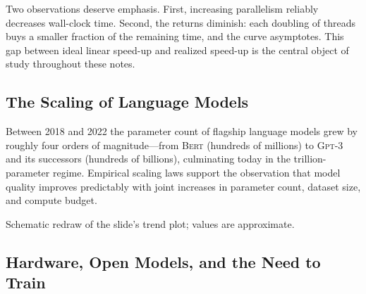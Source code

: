 \documentclass[11pt,a4paper]{article}
\theoremstyle{definition}
\theoremstyle{remark}
\theoremstyle{plain}
\begin{document}
Two observations deserve emphasis. First, increasing parallelism reliably
decreases wall-clock time. Second, the returns diminish: each doubling of
threads buys a smaller fraction of the remaining time, and the curve
asymptotes. This gap between ideal linear speed-up and realized speed-up
is the central object of study throughout these notes.

\subsection{The Scaling of Language Models}

Between 2018 and 2022 the parameter count of flagship language models grew
by roughly four orders of magnitude---from \textsc{Bert} (hundreds of
millions) to \textsc{Gpt-3} and its successors (hundreds of billions),
culminating today in the trillion-parameter regime. Empirical scaling laws
support the observation that model quality improves predictably with joint
increases in parameter count, dataset size, and compute budget.

\begin{center}
\par\smallskip
{\small Schematic redraw of the slide's trend plot; values are approximate.}
\end{center}

\subsection{Hardware, Open Models, and the Need to Train}
\end{document}
